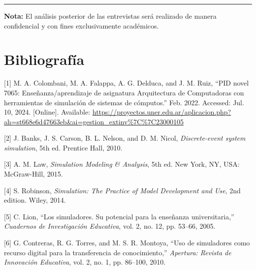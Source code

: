 \documentclass[12pt,oneside]{templates/unerthesis}
\newcommand{\CSLLeftMargin}[1]{#1} %
\newcommand{\CSLRightInline}[1]{#1} %
\newlength{\cslhangindent}
\newenvironment{CSLReferences}[2] %
 {\setlength{\parindent}{0pt}%
  \setlength{\leftskip}{#1 pt\relax}%
  \setlength{\parskip}{#2 pt\relax}%
  \everypar{\setlength{\hangindent}{\cslhangindent}}}
 {\par}
\begin{document}
\begin{center}\rule{0.5\linewidth}{0.5pt}\end{center}

\textbf{Nota:} El análisis posterior de las entrevistas será realizado de manera confidencial y con fines exclusivamente académicos.

\hypertarget{Biblio}{%
\chapter{Bibliografía}\label{Biblio}}

\hypertarget{refs}{}
\begin{CSLReferences}{0}{0}
\leavevmode{}%
\CSLLeftMargin{{[}1{]} }%
\CSLRightInline{M. A. Colombani, M. A. Falappa, A. G. Delduca, and J. M. Ruiz, {``{PID} novel 7065: {Enseñanza}/aprendizaje de asignatura {Arquitectura} de {Computadoras} con herramientas de simulación de sistemas de cómputos.''} Feb. 2022. Accessed: Jul. 10, 2024. {[}Online{]}. Available: \url{https://proyectos.uner.edu.ar/aplicacion.php?ah=st668e6d47663eb&ai=gestion_extinv\%7C\%7C23000105}}

\leavevmode{}%
\CSLLeftMargin{{[}2{]} }%
\CSLRightInline{J. Banks, J. S. Carson, B. L. Nelson, and D. M. Nicol, \emph{Discrete-event system simulation}, 5th ed. Prentice Hall, 2010.}

\leavevmode{}%
\CSLLeftMargin{{[}3{]} }%
\CSLRightInline{A. M. Law, \emph{Simulation {Modeling} \& {Analysis}}, 5th ed. New York, NY, USA: McGraw-Hill, 2015.}

\leavevmode{}%
\CSLLeftMargin{{[}4{]} }%
\CSLRightInline{S. Robinson, \emph{Simulation: {The} {Practice} of {Model} {Development} and {Use}}, 2nd edition. Wiley, 2014.}

\leavevmode{}%
\CSLLeftMargin{{[}5{]} }%
\CSLRightInline{C. Lion, {``Los simuladores. {Su} potencial para la enseñanza universitaria,''} \emph{Cuadernos de Investigación Educativa}, vol. 2, no. 12, pp. 53--66, 2005.}

\leavevmode{}%
\CSLLeftMargin{{[}6{]} }%
\CSLRightInline{G. Contreras, R. G. Torres, and M. S. R. Montoya, {``Uso de simuladores como recurso digital para la transferencia de conocimiento,''} \emph{Apertura: Revista de Innovación Educativa}, vol. 2, no. 1, pp. 86--100, 2010.}


\end{CSLReferences}
\end{document}
